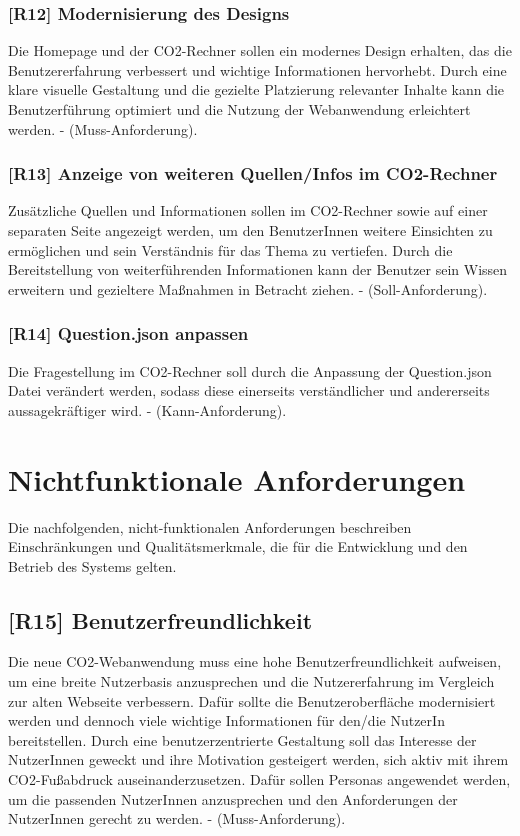 \subsubsection{[R12] Modernisierung des Designs}

Die Homepage und der CO2-Rechner sollen ein modernes Design erhalten, das die Benutzererfahrung verbessert und wichtige Informationen hervorhebt. Durch eine klare visuelle Gestaltung und die gezielte Platzierung relevanter Inhalte kann die Benutzerführung optimiert und die Nutzung der Webanwendung erleichtert werden. - (Muss-Anforderung).

\subsubsection{[R13] Anzeige von weiteren Quellen/Infos im CO2-Rechner}

Zusätzliche Quellen und Informationen sollen im CO2-Rechner sowie auf einer separaten Seite angezeigt werden, um den BenutzerInnen weitere Einsichten zu ermöglichen und sein Verständnis für das Thema zu vertiefen.
Durch die Bereitstellung von weiterführenden Informationen kann der Benutzer sein Wissen erweitern und gezieltere Maßnahmen in Betracht ziehen.
- (Soll-Anforderung).

\subsubsection{[R14] Question.json anpassen}

Die Fragestellung im CO2-Rechner soll durch die Anpassung der Question.json Datei verändert werden, sodass diese einerseits verständlicher und andererseits aussagekräftiger wird. - (Kann-Anforderung).

\section{Nichtfunktionale Anforderungen}
\label{chapter:3-section:nichtfunktionale-anforderungen}

Die nachfolgenden, nicht-funktionalen Anforderungen beschreiben Einschränkungen und Qualitätsmerkmale, die für die Entwicklung und den Betrieb des Systems gelten.

\subsection{[R15] Benutzerfreundlichkeit}

Die neue CO2-Webanwendung muss eine hohe Benutzerfreundlichkeit aufweisen, um eine breite Nutzerbasis anzusprechen und die Nutzererfahrung im Vergleich zur alten Webseite verbessern.
Dafür sollte die Benutzeroberfläche modernisiert werden und dennoch viele wichtige Informationen für den/die NutzerIn bereitstellen.
Durch eine benutzerzentrierte Gestaltung soll das Interesse der NutzerInnen geweckt und ihre Motivation gesteigert werden, sich aktiv mit ihrem CO2-Fußabdruck auseinanderzusetzen.
Dafür sollen Personas angewendet werden, um die passenden NutzerInnen anzusprechen und den Anforderungen der NutzerInnen gerecht zu werden.
- (Muss-Anforderung).

